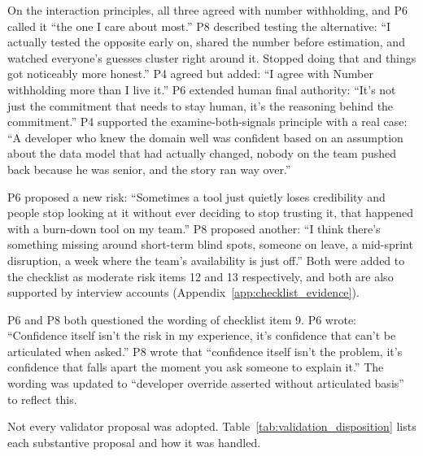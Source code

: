 \documentclass[a4paper,twoside]{bth}
\begin{document}
On the interaction principles, all three agreed with number withholding, and P6 called it ``the one I care about most.'' P8 described testing the alternative: ``I actually tested the opposite early on, shared the number before estimation, and watched everyone's guesses cluster right around it. Stopped doing that and things got noticeably more honest.'' P4 agreed but added: ``I agree with Number withholding more than I live it.'' P6 extended human final authority: ``It's not just the commitment that needs to stay human, it's the reasoning behind the commitment.'' P4 supported the examine-both-signals principle with a real case: ``A developer who knew the domain well was confident based on an assumption about the data model that had actually changed, nobody on the team pushed back because he was senior, and the story ran way over.''

P6 proposed a new risk: ``Sometimes a tool just quietly loses credibility and people stop looking at it without ever deciding to stop trusting it, that happened with a burn-down tool on my team.'' P8 proposed another: ``I think there's something missing around short-term blind spots, someone on leave, a mid-sprint disruption, a week where the team's availability is just off.'' Both were added to the checklist as moderate risk items 12 and 13 respectively, and both are also supported by interview accounts (Appendix~\ref{app:checklist_evidence}).

P6 and P8 both questioned the wording of checklist item 9. P6 wrote: ``Confidence itself isn't the risk in my experience, it's confidence that can't be articulated when asked.'' P8 wrote that ``confidence itself isn't the problem, it's confidence that falls apart the moment you ask someone to explain it.'' The wording was updated to ``developer override asserted without articulated basis'' to reflect this.

Not every validator proposal was adopted. Table~\ref{tab:validation_disposition} lists each substantive proposal and how it was handled.
\end{document}
